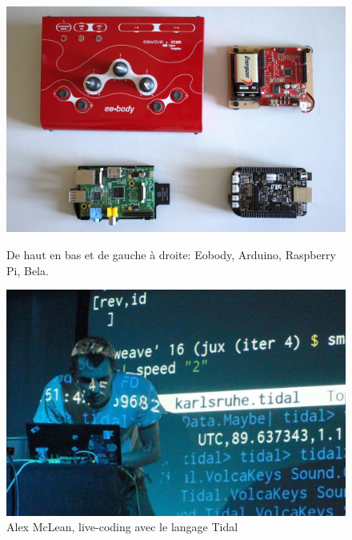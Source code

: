 \begin{figure}[!htbp]
	\captionsetup{format=plain}%
	\centering
	\begin{minipage}[t]{0.48\textwidth}
		\includegraphics[width=\linewidth]{gfx/02_ephemeral/Eobody-arduino-raspi-bela_144px.jpg}
		\caption[Eobody, Arduino, Raspberry Pi, Bela]{De haut en bas et de gauche à droite: Eobody, Arduino, Raspberry Pi, Bela.}
		\label{fig:ephemeral:DIY-devices}
	\end{minipage}
	\hspace{.02\linewidth}
	\begin{minipage}[t]{0.48\textwidth}
	  \includegraphics[width=\linewidth]{gfx/02_ephemeral/alex_mclean_144px.jpg}
		\caption[Alex McLean, live-coding avec le langage Tidal]{Alex McLean, live-coding avec le langage Tidal}
		\label{fig:ephemeral:livecoding}
	\end{minipage}
\end{figure}

